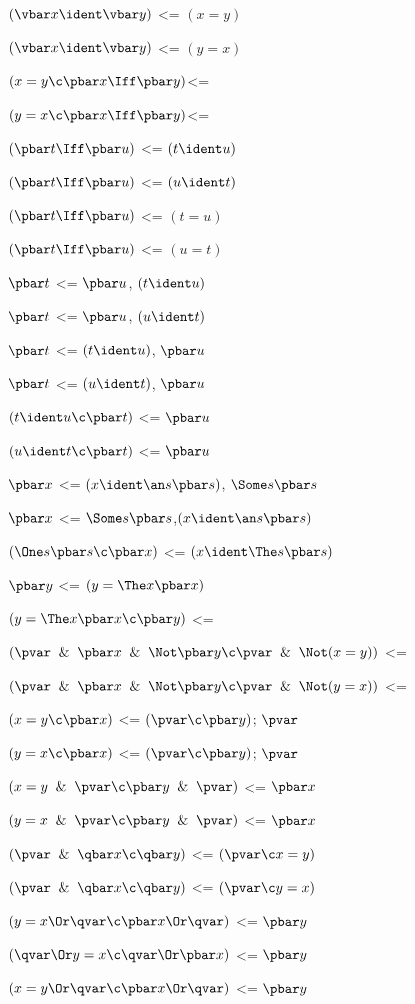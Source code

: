 $(\vbar x \ident \vbar y)$ <= $(x = y)$

$(\vbar x \ident \vbar y)$ <= $(y = x)$

$(x = y \c \pbar x \Iff \pbar y)$<= 

$(y = x \c \pbar x \Iff \pbar y)$<= 

$(\pbar t \Iff \pbar u)$ <= $(t \ident u)$

$(\pbar t \Iff \pbar u)$ <= $(u \ident t)$

$(\pbar t \Iff \pbar u)$ <= $(t = u)$

$(\pbar t \Iff \pbar u)$ <= $(u = t)$

$\pbar t$ <= $\pbar u$,  $(t \ident u)$

$\pbar t$ <= $\pbar u$, $(u \ident t)$

$\pbar t$ <= $(t \ident u)$, $\pbar u$ 

$\pbar t$ <= $(u \ident t)$, $\pbar u$ 

$(t \ident u \c \pbar t)$ <= $\pbar u$ 

$(u \ident t \c \pbar t)$ <= $\pbar u$ 

$\pbar x$ <= $(x \ident \an s \pbar s)$, $\Some s \pbar s$

$\pbar x$ <=  $\Some s \pbar s$,$(x \ident \an s \pbar s)$

$(\One s \pbar s \c \pbar x)$ <= $(x \ident \The s \pbar s)$

$\pbar y$ <= $(y  =  \The x\pbar x)$

$(y = \The x \pbar x \c \pbar y)$ <=

$(\pvar\And\pbar x\And\Not \pbar y \c \pvar \And \Not (x = y))$ <=

$(\pvar\And\pbar x\And\Not \pbar y \c \pvar \And \Not (y = x))$ <=

$(x = y \c \pbar x )$ <= $(\pvar \c \pbar y)$; $\pvar$

$(y = x \c \pbar x )$ <= $(\pvar \c \pbar y)$; $\pvar$

$(x = y \And \pvar \c \pbar y \And \pvar)$ <= $\pbar x$

$(y = x \And \pvar \c \pbar y \And \pvar)$ <= $\pbar x$

$(\pvar \And \qbar x \c \qbar y)$ <= $(\pvar \c x = y)$

$(\pvar \And \qbar x \c \qbar y)$ <= $(\pvar \c y = x)$

$(y = x \Or \qvar \c \pbar x \Or \qvar)$ <= $\pbar y$

$(\qvar \Or y = x \c\qvar \Or  \pbar x )$ <= $\pbar y$

$(x = y \Or \qvar \c \pbar x \Or \qvar)$ <= $\pbar y$

